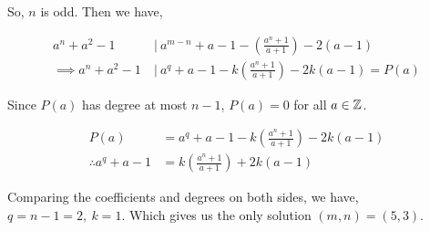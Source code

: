 \begin{solution}[Manipulation]
		So, $ n $ is odd. Then we have,
		
		\begin{align*}
		a^n+a^2-1\ &|\ a^{m-n} + a-1 - \left(\frac{a^n+1}{a+1}\right) - 2(a-1)\\[.5em]
		\implies a^n+a^2-1\ &|\ a^q + a -1 - k\left(\frac{a^n+1}{a+1}\right) -2k(a-1) = P(a)
		\end{align*}
		
		Since $ P(a) $ has degree at most $ n-1 $, $ P(a) =0 $ for all $ a\in \mathbb{Z} $.
		
		
		\begin{align*}
		P(a) &= a^q + a -1 - k\left(\frac{a^n+1}{a+1}\right) -2k(a-1)\\
		\therefore a^q + a - 1 &= k\left(\frac{a^n+1}{a+1}\right)+2k(a-1)
		\end{align*}
		
		Comparing the coefficients and degrees on both sides, we have, $ q=n-1=2,\ k=1 $. Which gives us the only solution $ (m, n) = (5, 3) $.
	\end{solution}